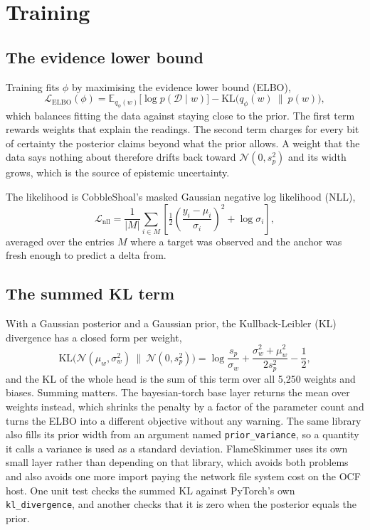 \documentclass{article}
\begin{document}
\section{Training}
\label{sec:training}

\subsection{The evidence lower bound}
\label{sec:elbo}

Training fits $\phi$ by maximising the evidence lower bound (ELBO),
\begin{equation}
  \mathcal{L}_{\mathrm{ELBO}}(\phi) =
    \mathbb{E}_{q_{\phi}(w)}\big[\log p(\mathcal{D} \mid w)\big]
    - \mathrm{KL}\big(q_{\phi}(w)\ \|\ p(w)\big),
\end{equation}
which balances fitting the data against staying close to the prior. The first
term rewards weights that explain the readings. The second term charges for
every bit of certainty the posterior claims beyond what the prior allows. A
weight that the data says nothing about therefore drifts back toward
$\mathcal{N}(0, s_p^2)$ and its width grows, which is the source of epistemic
uncertainty.

The likelihood is CobbleShoal's masked Gaussian negative log likelihood (NLL),
\begin{equation}
  \mathcal{L}_{\mathrm{nll}} = \frac{1}{|M|} \sum_{i \in M}
    \left[ \tfrac{1}{2} \left( \frac{y_i - \mu_i}{\sigma_i} \right)^{2} + \log \sigma_i \right],
\end{equation}
averaged over the entries $M$ where a target was observed and the anchor was
fresh enough to predict a delta from.

\subsection{The summed KL term}
\label{sec:kl}

With a Gaussian posterior and a Gaussian prior, the Kullback-Leibler (KL)
divergence has a closed form per weight,
\begin{equation}
  \mathrm{KL}\big(\mathcal{N}(\mu_{w}, \sigma_{w}^{2})\ \|\ \mathcal{N}(0, s_{p}^{2})\big)
  = \log\frac{s_{p}}{\sigma_{w}} + \frac{\sigma_{w}^{2} + \mu_{w}^{2}}{2 s_{p}^{2}} - \frac{1}{2},
\end{equation}
and the KL of the whole head is the sum of this term over all 5{,}250 weights
and biases. Summing matters. The bayesian-torch base layer returns the mean
over weights instead, which shrinks the penalty by a factor of the parameter
count and turns the ELBO into a different objective without any warning. The
same library also fills its prior width from an argument named
\texttt{prior\_variance}, so a quantity it calls a variance is used as a
standard deviation. FlameSkimmer uses its own small layer rather than depending
on that library, which avoids both problems and also avoids one more import
paying the network file system cost on the OCF host. One unit test checks the
summed KL against PyTorch's own \texttt{kl\_divergence}, and another checks
that it is zero when the posterior equals the prior.
\end{document}
